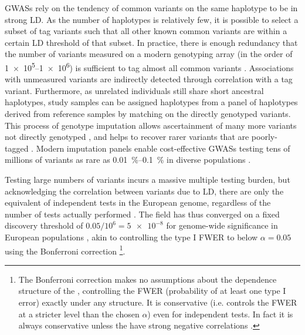 \begin{outline}
\glspl{GWAS} rely on the tendency of common variants on the same haplotype to be in strong \gls{LD}.
As the number of haplotypes is relatively few, 
it is possible to select a subset of tag variants such that all other known common variants are within a certain \gls{LD} threshold of that subset. 
In practice, there is enough redundancy that the number of variants measured on a modern genotyping array (in the order of \numrange[retain-unity-mantissa=false]{1e5}{1e6}) is sufficient to tag almost all common variants  \autocite{theinternationalhapmapconsortium2005HaplotypeMapHuman,barrett2006EvaluatingCoverageGenomewide}.
Associations with unmeasured variants are indirectly detected through correlation with a tag variant.
Furthermore, as unrelated individuals still share short ancestral haplotypes, 
study samples can be assigned haplotypes from a panel of haplotypes derived from reference samples by matching on the directly genotyped variants.
This process of genotype imputation allows ascertainment of many more variants not directly genotyped \autocite{das2018GenotypeImputationLarge},
and helps to recover rarer variants that are poorly-tagged \autocite{visscher201710YearsGWAS}.
Modern imputation panels enable cost-effective \glspl{GWAS} testing tens of millions of variants as rare as \SIrange[parse-numbers=false]{0.01}{0.1}{\percent} in diverse populations \autocite{taliun2019Sequencing53831}.

Testing large numbers of variants incurs a massive multiple testing burden, but acknowledging the correlation between variants due to \gls{LD},
there are only the equivalent of  independent tests in the European genome, regardless of the number of tests actually performed \autocite{peer2008EstimationMultipleTesting}.
The field has thus converged on a fixed discovery threshold of $0.05 / 10^6 = \num{5e-8}$ for genome-wide significance in European populations \autocite{jannot2015108HasEmerged}, akin to controlling the type I \gls{FWER} to below $\alpha = 0.05$ using the Bonferroni correction%
\footnote{
    The Bonferroni correction makes no assumptions about the dependence structure of the \pvalues{}, controlling the \gls{FWER} (probability of at least one type I error) exactly under any structure.
    It is conservative (i.e. controls the \gls{FWER} at a stricter level than the chosen $\alpha$) even for independent tests. 
    In fact it is always conservative unless the \pvalues{} have strong negative correlations \autocite{goeman2014MultipleHypothesisTesting}.
}.


\end{outline}
